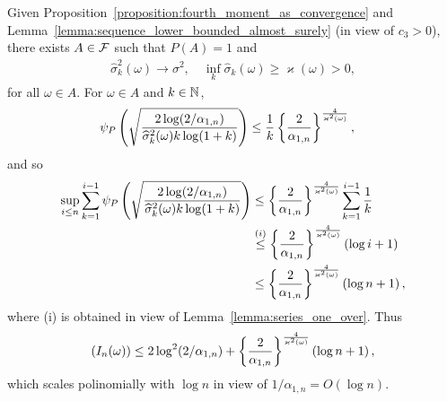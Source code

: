  Given Proposition~\ref{proposition:fourth_moment_as_convergence} and Lemma~\ref{lemma:sequence_lower_bounded_almost_surely} (in view of $c_3 > 0$), there exists $A \in \mathcal{F}$ such that $P(A) = 1$ and %
\begin{align*}
    \widehat\sigma_{k}^2(\omega) \to \sigma^2, \quad \inf_k \widehat\sigma_{k}(\omega) \geq \varkappa(\omega) > 0,
\end{align*}
for all $\omega \in A$. For $\omega \in A$ and $k \in \mathbb{N}$,
\begin{align*}
    \psi_P\left(\sqrt\frac{2\log(2/\alpha_{1,n})}{\widehat \sigma_{k}^2(\omega) k \log (1+k)}\right) &\leq \frac{1}{k} \left\{ \frac{2}{\alpha_{1,n}}\right\}^{\frac{4}{ \varkappa^2(\omega) }}, 
\end{align*}
and so 
\begin{align*}
    \sup_{i \leq n}\sum_{k=1}^{i-1} \psi_P\left(\sqrt\frac{2\log(2/\alpha_{1,n})}{\widehat \sigma_{k}^2(\omega) k \log (1+k)}\right) &\leq \left\{ \frac{2}{\alpha_{1,n}}\right\}^{\frac{4}{ \varkappa^2(\omega) }} \sum_{k=1}^{i-1} \frac{1}{k} 
    \\&\stackrel{(i)}{\leq}\left\{ \frac{2}{\alpha_{1,n}}\right\}^{\frac{4}{ \varkappa^2(\omega) }} \left( \log i + 1 \right)
     \\&\stackrel{}{\leq}\left\{ \frac{2}{\alpha_{1,n}}\right\}^{\frac{4}{ \varkappa^2(\omega) }} \left( \log n + 1 \right),
\end{align*}
where (i) is obtained in view of Lemma~\ref{lemma:series_one_over}. Thus
\begin{align*}
    \left( I_n(\omega) \right) \leq 2\log^2(2/\alpha_{1,n}) + \left\{ \frac{2}{\alpha_{1,n}}\right\}^{\frac{4}{ \varkappa^2(\omega) }} \left( \log n + 1 \right),
\end{align*}
which scales polinomially with $\log n$ in view of $1/\alpha_{1, n} = O(\log n )$. 


